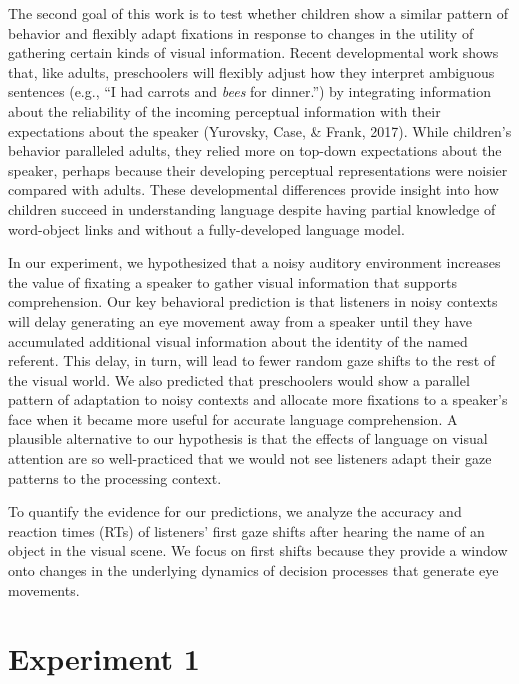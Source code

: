 \documentclass[english,man]{apa6}
\theoremstyle{definition}
\theoremstyle{definition}
\theoremstyle{definition}
\theoremstyle{remark}
\begin{document}
The second goal of this work is to test whether children show a similar
pattern of behavior and flexibly adapt fixations in response to changes
in the utility of gathering certain kinds of visual information. Recent
developmental work shows that, like adults, preschoolers will flexibly
adjust how they interpret ambiguous sentences (e.g., \enquote{I had
carrots and \emph{bees} for dinner.}) by integrating information about
the reliability of the incoming perceptual information with their
expectations about the speaker (Yurovsky, Case, \& Frank, 2017). While
children's behavior paralleled adults, they relied more on top-down
expectations about the speaker, perhaps because their developing
perceptual representations were noisier compared with adults. These
developmental differences provide insight into how children succeed in
understanding language despite having partial knowledge of word-object
links and without a fully-developed language model.

In our experiment, we hypothesized that a noisy auditory environment
increases the value of fixating a speaker to gather visual information
that supports comprehension. Our key behavioral prediction is that
listeners in noisy contexts will delay generating an eye movement away
from a speaker until they have accumulated additional visual information
about the identity of the named referent. This delay, in turn, will lead
to fewer random gaze shifts to the rest of the visual world. We also
predicted that preschoolers would show a parallel pattern of adaptation
to noisy contexts and allocate more fixations to a speaker's face when
it became more useful for accurate language comprehension. A plausible
alternative to our hypothesis is that the effects of language on visual
attention are so well-practiced that we would not see listeners adapt
their gaze patterns to the processing context.

To quantify the evidence for our predictions, we analyze the accuracy
and reaction times (RTs) of listeners' first gaze shifts after hearing
the name of an object in the visual scene. We focus on first shifts
because they provide a window onto changes in the underlying dynamics of
decision processes that generate eye movements.

\hypertarget{experiment-1}{%
\section{Experiment 1}\label{experiment-1}}
\end{document}
